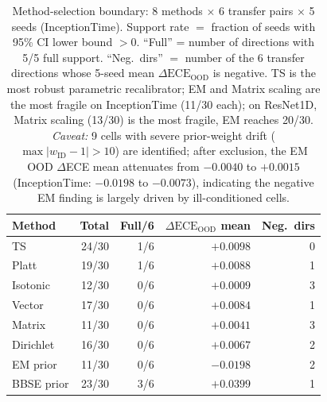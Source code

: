 \documentclass[final,5p,times,nonatbib]{elsarticle}
\begin{document}
\begin{table}[t]
\centering
\caption{Method-selection boundary: 8 methods $\times$ 6 transfer pairs
$\times$ 5 seeds (InceptionTime). Support rate $=$ fraction of seeds
with 95\% CI lower bound $>0$. ``Full'' = number of directions with
5/5 full support. ``Neg.\ dirs'' $=$ number of the 6 transfer
directions whose 5-seed mean $\Delta\text{ECE}_{\text{OOD}}$ is
negative. TS is the most robust parametric recalibrator;
EM and Matrix scaling are the most fragile on InceptionTime
(11/30 each); on ResNet1D, Matrix scaling (13/30) is the most
fragile, EM reaches 20/30. \textit{Caveat:} 9 cells with severe
prior-weight drift ($\max |w_{\text{ID}}-1| > 10$) are identified;
after exclusion, the EM OOD $\Delta$ECE mean attenuates from
$-0.0040$ to $+0.0015$ (InceptionTime: $-0.0198$ to $-0.0073$),
indicating the negative EM finding is largely driven by
ill-conditioned cells.}
\label{tab:methods}
\footnotesize
\begin{tabular}{lrrrr}
\toprule
Method & Total & Full/6 & $\Delta\text{ECE}_{\text{OOD}}$ mean & Neg.\ dirs \\
\midrule
TS         & 24/30 & 1/6 & $+0.0098$ & 0 \\
Platt      & 19/30 & 1/6 & $+0.0088$ & 1 \\
Isotonic   & 12/30 & 0/6 & $+0.0009$ & 3 \\
Vector     & 17/30 & 0/6 & $+0.0084$ & 1 \\
Matrix     & 11/30 & 0/6 & $+0.0041$ & 3 \\
Dirichlet  & 16/30 & 0/6 & $+0.0067$ & 2 \\
EM prior   & 11/30 & 0/6 & $-0.0198$ & 2 \\
BBSE prior & 23/30 & 3/6 & $+0.0399$ & 1 \\
\bottomrule
\end{tabular}
\end{table}
\end{document}
